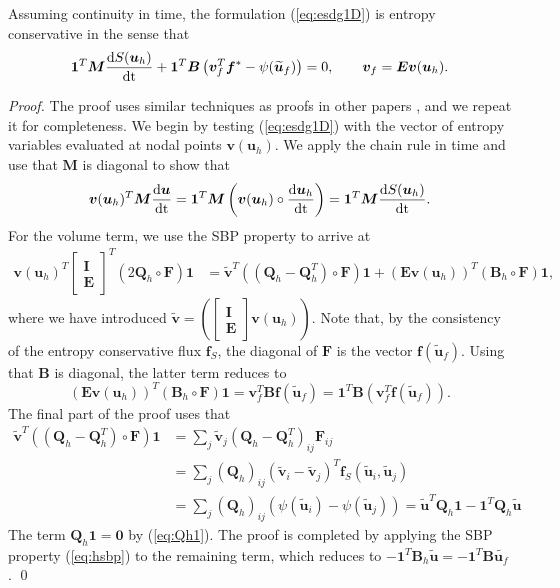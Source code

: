 \documentclass{svjour3}                     %
\renewcommand{\tilde}{\widetilde}
\newcommand{\td}[2]{\frac{{\rm d}#1}{{\rm d}{\rm #2}}}
\newcommand{\LRp}[1]{\left( #1 \right)}
\begin{document}
\begin{theorem}
Assuming continuity in time, the formulation (\ref{eq:esdg1D}) is entropy conservative in the sense that
\[
\bm{1}^T\bm{M}\td{S(\bm{u}_h)}{t} + \bm{1}^T\bm{B}\LRp{\bm{v}_f^T\bm{f}^* - \psi(\tilde{\bm{u}}_f)} = 0, \qquad \bm{v}_f =\bm{E}\bm{v}(\bm{u}_h).
\]
\end{theorem}
\begin{proof}
The proof uses similar techniques as proofs in other papers \cite{chen2017entropy, crean2018entropy, chan2017discretely, chan2019skew}, and we repeat it for completeness.  We begin by testing (\ref{eq:esdg1D}) with the vector of entropy variables evaluated at nodal points $\bm{v}(\bm{u}_h)$.  We apply the chain rule in time and use that $\bm{M}$ is diagonal to show that 
\[
\bm{v}(\bm{u}_h)^T\bm{M}\td{\bm{u}}{t} = \bm{1}^T\bm{M}\LRp{\bm{v}(\bm{u}_h)\circ \td{\bm{u}_h}{t}} =  \bm{1}^T\bm{M}\td{S(\bm{u}_h)}{t}.
\]
For the volume term, we use the SBP property to arrive at
\begin{align*}
\bm{v}(\bm{u}_h)^T\begin{bmatrix} \bm{I} \\ \bm{E} \end{bmatrix}^T\LRp{2\bm{Q}_h \circ \bm{F}}\bm{1} &= \tilde{\bm{v}}^T\LRp{\LRp{\bm{Q}_h-\bm{Q}_h^T} \circ \bm{F}}\bm{1}  + \LRp{\bm{E}\bm{v}(\bm{u}_h)}^T\LRp{\bm{B}_h \circ\bm{F}}\bm{1},
\end{align*}
where we have introduced $\tilde{\bm{v}} = \LRp{\begin{bmatrix} \bm{I} \\ \bm{E} \end{bmatrix}\bm{v}(\bm{u}_h)}$.  
Note that, by the consistency of the entropy conservative flux $\bm{f}_S$, the diagonal of $\bm{F}$ is the vector $\bm{f}(\tilde{\bm{u}}_f)$.  Using that $\bm{B}$ is diagonal, the latter term reduces to 
\[
\LRp{\bm{E}\bm{v}(\bm{u}_h)}^T\LRp{\bm{B}_h \circ\bm{F}}\bm{1} = \bm{v}_f^T \bm{B}\bm{f}(\tilde{\bm{u}}_f) =  \bm{1}^T \bm{B}\LRp{\bm{v}_f^T\bm{f}(\tilde{\bm{u}}_f)}.
\]
The final part of the proof uses that 
\begin{align*}
\tilde{\bm{v}}^T\LRp{\LRp{\bm{Q}_h-\bm{Q}_h^T} \circ \bm{F}}\bm{1} &= \sum_j {\tilde{\bm{v}}}_j \LRp{\bm{Q}_h-\bm{Q}_h^T}_{ij} \bm{F}_{ij}\\
&= \sum_j \LRp{\bm{Q}_h}_{ij} \LRp{{\tilde{\bm{v}}}_i-{\tilde{\bm{v}}}_j}^T\bm{f}_{S}\LRp{\tilde{\bm{u}}_i,\tilde{\bm{u}}_j}\\
&= \sum_j \LRp{\bm{Q}_h}_{ij} \LRp{\psi(\tilde{\bm{u}}_i)-\psi(\tilde{\bm{u}}_j)} = \tilde{\bm{u}}^T\bm{Q}_h\bm{1}- \bm{1}^T\bm{Q}_h\tilde{\bm{u}}
\end{align*}
The term $\bm{Q}_h\bm{1} = \bm{0}$ by (\ref{eq:Qh1}).  The proof is completed by applying the SBP property (\ref{eq:hsbp}) to the remaining term, which reduces to $-\bm{1}^T\bm{B}_h\tilde{\bm{u}}=-\bm{1}^T\bm{B}\tilde{\bm{u}_f}$.
\qed\end{proof}
\end{document}
